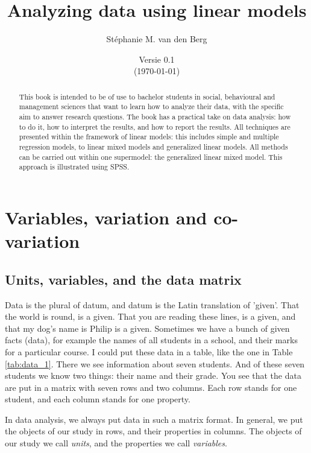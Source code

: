 \documentclass[]{report}\usepackage[]{graphicx}\usepackage[]{color}
\title{Analyzing data using linear models}
\author{St\'ephanie M. van den Berg}
\date{Versie 0.1 \\ (\today)}
\begin{document}
\maketitle




\begin{abstract}
This book is intended to be of use to bachelor students in social, behavioural and management sciences that want to learn how to analyze their data, with the specific aim to answer research questions. The book has a practical take on data analysis: how to do it, how to interpret the results, and how to report the results. All techniques are presented within the framework of linear models: this includes simple and multiple regression models, to linear mixed models and generalized linear models. All methods can be carried out within one supermodel: the generalized linear mixed model. This approach is illustrated using SPSS.
\end{abstract}


\tableofcontents



\chapter{Variables, variation and co-variation} \label{chap:intro}


\section{Units, variables, and the data matrix}



Data is the plural of datum, and datum is the Latin translation of 'given'. That the world is round, is a given. That you are reading these lines, is a given, and that my dog's name is Philip is a given. Sometimes we have a bunch of given facts (data), for example the names of all students in a school, and their marks for a particular course. I could put these data in a table, like the one in Table \ref{tab:data_1}. There we see information about seven students. And of these seven students we know two things: their name and their grade. You see that the data are put in a matrix with seven rows and two columns. Each row stands for one student, and each column stands for one property.

In data analysis, we always put data in such a matrix format. In general, we put the objects of our study in rows, and their properties in columns. The objects of our study we call \textit{units}, and the properties we call \textit{variables}.
\end{document}

